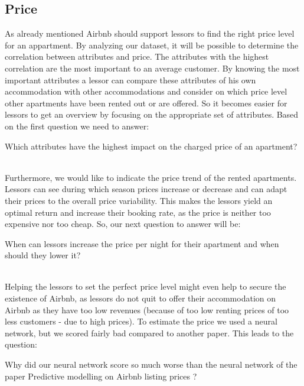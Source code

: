 \documentclass[journal]{IEEEtran}
\begin{document}
\subsection{Price}
\noindent As already mentioned Airbnb should support lessors to find the right price level for an appartment. By analyzing our dataset, it will be possible to determine the correlation between attributes and price. The attributes with the highest correlation are the most important to an average customer. By knowing the most important attributes a lessor can compare these attributes of his own accommodation with other accommodations and consider on which price level other apartments have been rented out or are offered. So it becomes easier for lessors to get an overview by focusing on the appropriate set of attributes. Based on the first question we need to answer:
\begin{itshape}
Which attributes have the highest impact on the charged price of an apartment?
\end{itshape}\\
Furthermore, we would like to indicate the price trend of the rented apartments. Lessors can see during which season prices increase or decrease and can adapt their prices to the overall price variability. This makes the lessors yield an optimal return and increase their booking rate, as the price is neither too expensive nor too cheap. So, our next question to answer will be:
\begin{itshape}
When can lessors increase the price per night for their apartment and when should they lower it?
\end{itshape}\\
Helping the lessors to set the perfect price level might even help to secure the existence of Airbnb, as lessors do not quit to offer their accommodation on Airbnb as they have too low revenues (because of too low renting prices of too less customers - due to high prices).
To estimate the price we used a neural network, but we scored fairly bad compared to another paper. This leads to the question:
\begin{itshape}
Why did our neural network score so much worse than the neural network of the paper Predictive modelling on Airbnb listing prices \cite{RN1}?
\end{itshape}
\end{document}
